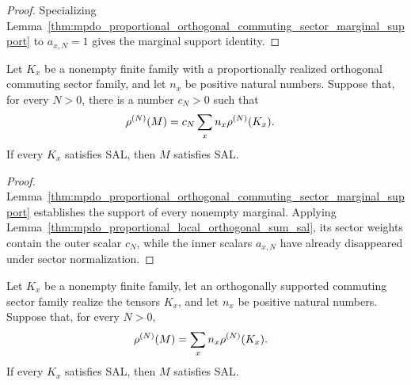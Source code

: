 \begin{proof}\leanok
    Specializing
    Lemma~\ref{thm:mpdo_proportional_orthogonal_commuting_sector_marginal_support}
    to $a_{x,N}=1$ gives the marginal support identity.
\end{proof}

\begin{lemma}
    \label{thm:mpdo_proportional_orthogonal_commuting_sector_sum_sal}
    \leanok
    Let $K_x$ be a nonempty finite family with a proportionally realized
    orthogonal commuting sector family, and let $n_x$ be positive natural
    numbers. Suppose that, for every $N>0$, there is a number $c_N>0$ such
    that
    \begin{align}
        \rho^{(N)}(M)
         & =c_N\sum_x n_x\rho^{(N)}(K_x).
        \notag
    \end{align}
    If every $K_x$ satisfies SAL, then $M$ satisfies SAL.
\end{lemma}

\begin{proof}\leanok
    Lemma~\ref{thm:mpdo_proportional_orthogonal_commuting_sector_marginal_support}
    establishes the support of every nonempty marginal. Applying
    Lemma~\ref{thm:mpdo_proportional_local_orthogonal_sum_sal}, its
    sector weights contain the outer scalar $c_N$, while the inner scalars
    $a_{x,N}$ have already disappeared under sector normalization.
\end{proof}

\begin{lemma}
    \label{cor:mpdo_orthogonal_commuting_sector_sum_sal}
    \leanok
    Let $K_x$ be a nonempty finite family, let an orthogonally supported
    commuting sector family realize the tensors $K_x$, and let $n_x$ be
    positive natural numbers.
    Suppose that, for every $N>0$,
    \begin{align}
        \rho^{(N)}(M)
         & =\sum_x n_x\rho^{(N)}(K_x).
        \notag
    \end{align}
    If every $K_x$ satisfies SAL, then $M$ satisfies SAL.
\end{lemma}

